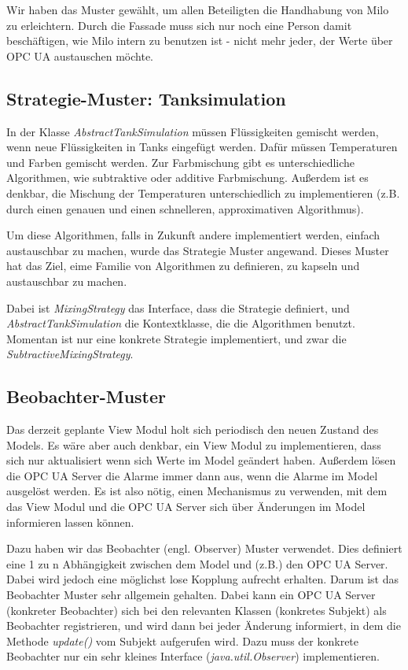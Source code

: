 \documentclass[parskip=full]{scrartcl}
\begin{document}
Wir haben das Muster gewählt, um allen
Beteiligten die Handhabung von Milo zu erleichtern. Durch die Fassade muss sich nur noch eine Person damit beschäftigen, wie
Milo intern zu benutzen ist - nicht mehr jeder, der Werte über OPC UA austauschen möchte.

\subsection{Strategie-Muster: Tanksimulation}
In der Klasse \emph{AbstractTankSimulation} müssen Flüssigkeiten gemischt werden, wenn neue Flüssigkeiten in Tanks eingefügt werden.
Dafür müssen Temperaturen und Farben gemischt werden. Zur Farbmischung gibt es unterschiedliche Algorithmen, wie subtraktive oder additive
Farbmischung. Außerdem ist es denkbar, die Mischung der Temperaturen unterschiedlich zu implementieren (z.B. durch einen genauen und einen schnelleren,
approximativen Algorithmus).

Um diese Algorithmen, falls in Zukunft andere implementiert werden, einfach austauschbar zu machen, wurde
das Strategie Muster angewand. Dieses Muster hat das Ziel, eime Familie von Algorithmen zu definieren, zu kapseln und austauschbar zu machen.

Dabei ist \emph{MixingStrategy} das Interface, dass die Strategie definiert, und \emph{AbstractTankSimulation} die Kontextklasse, die die Algorithmen
benutzt. Momentan ist nur eine konkrete Strategie implementiert, und zwar die \emph{SubtractiveMixingStrategy}.

\subsection{Beobachter-Muster}
Das derzeit geplante View Modul holt sich periodisch den neuen Zustand des Models. Es wäre aber auch denkbar, ein View Modul zu implementieren,
dass sich nur aktualisiert wenn sich Werte im Model geändert haben. Außerdem lösen die OPC UA Server die Alarme immer dann aus, wenn die Alarme im Model
ausgelöst werden. Es ist also nötig, einen Mechanismus zu verwenden, mit dem das View Modul und die OPC UA Server sich über Änderungen im Model informieren
lassen können.

Dazu haben wir das Beobachter (engl. Observer) Muster verwendet. Dies definiert eine 1 zu n Abhängigkeit zwischen dem Model und (z.B.) den OPC UA Server.
Dabei wird jedoch eine möglichst lose Kopplung aufrecht erhalten. Darum ist das Beobachter Muster sehr allgemein gehalten. Dabei kann ein OPC UA Server (konkreter Beobachter)
sich bei den relevanten Klassen (konkretes Subjekt) als Beobachter registrieren, und wird dann bei jeder Änderung informiert, in dem die Methode \emph{update()}
vom Subjekt aufgerufen wird. Dazu muss der konkrete Beobachter nur ein sehr kleines Interface (\emph{java.util.Observer}) implementieren.
\end{document}
